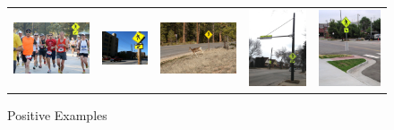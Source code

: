 \documentclass[12pt]{article}\sloppy
\begin{document}
\begin{figure}[f]
\centering
\begin{tabular}{c c c c c}
  \includegraphics[width=0.18\linewidth]{../data/test0.jpg} & \includegraphics[width=0.18\linewidth]{../data/test1.jpg} &
  \includegraphics[width=0.18\linewidth]{../data/test2.jpg} & \includegraphics[width=0.18\linewidth]{../data/test3.jpg} &
  \includegraphics[width=0.18\linewidth]{../data/test4.jpg} \\
\end{tabular}
\caption{Positive Examples}
\label{fig:3.1}
\end{figure}
\end{document}

